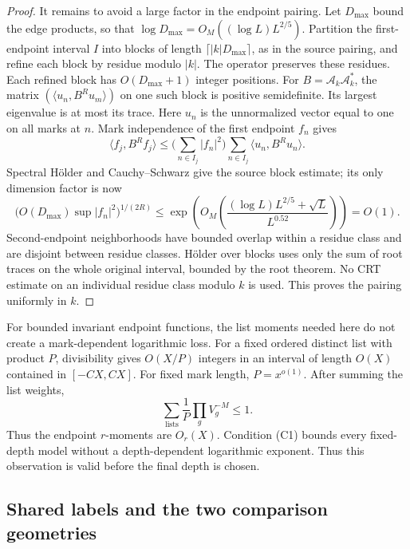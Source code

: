 \begin{proof}
It remains to avoid a large factor in the endpoint pairing.
Let \(D_{\max}\) bound the edge products, so that
\(\log D_{\max}=O_M((\log L)L^{2/5})\).
Partition the first-endpoint interval \(I\) into blocks of length
\(\lceil |k|D_{\max}\rceil\), as in the source pairing, and refine
each block by residue modulo \(|k|\).
The operator preserves these residues.
Each refined block has \(O(D_{\max}+1)\) integer positions.
For \(B=\mathcal A_k\mathcal A_k^*\), the matrix
\((\langle u_n,B^Ru_m\rangle)\) on one such block is positive
semidefinite.  Its largest eigenvalue is at most its trace.
Here \(u_n\) is the unnormalized vector equal to one on all marks at
\(n\).  Mark independence of the first endpoint \(f_n\) gives
\[
 \langle f_j,B^Rf_j\rangle
 \le \Big(\sum_{n\in I_j}|f_n|^2\Big)
             \sum_{n\in I_j}\langle u_n,B^Ru_n\rangle.
\]
Spectral H\"older and Cauchy--Schwarz give the source block estimate;
its only dimension factor is now
\begin{equation}
 \big(O(D_{\max})\sup|f_n|^2\big)^{1/(2R)}
 \le
 \exp\!\left(O_M\!\left(
 \frac{(\log L)L^{2/5}+\sqrt L}{L^{0.52}}\right)\right)=O(1).
 \label{eq:gr-block}
\end{equation}
Second-endpoint neighborhoods have bounded overlap within a residue
class and are disjoint between residue classes.
H\"older over blocks uses only the sum of root traces on the whole
original interval, bounded by the root theorem.
No CRT estimate on an individual residue class modulo \(k\) is used.
This proves the pairing uniformly in \(k\).
\end{proof}

For bounded invariant endpoint functions, the list moments needed
here do not create a mark-dependent logarithmic loss.  For a fixed
ordered distinct list with product \(P\), divisibility gives
\(O(X/P)\) integers in an interval of length \(O(X)\) contained in
\([-CX,CX]\).  For fixed mark length, \(P=x^{o(1)}\).
After summing the list weights,
\begin{equation}
 \sum_{\text{lists}}\frac1P\prod_gV_g^{-M}\le1.
 \label{eq:gr-list-moments}
\end{equation}
Thus the endpoint \(r\)-moments are \(O_r(X)\).
Condition \textup{(C1)} bounds every fixed-depth model without a
depth-dependent logarithmic exponent. Thus this observation is valid
before the final depth is chosen.

\subsection{Shared labels and the two comparison geometries}

